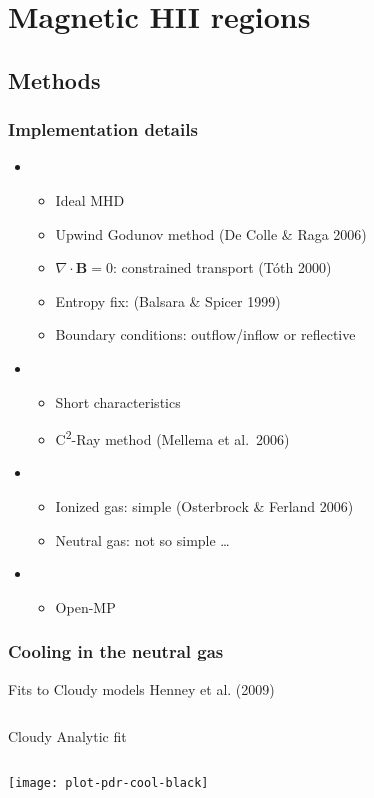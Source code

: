 \documentclass{beamer}
\newcommand\Ref[1]{\textcolor{white!70!black!90!yellow}{#1}}
\begin{document}
\section{Magnetic HII regions}

\subsection{Methods}

\begin{frame}
  \frametitle{Implementation details}
  \begin{itemize}
  \item {}
    \begin{itemize}
    \item Ideal MHD
    \item Upwind Godunov method \Ref{(De Colle \& Raga 2006)}
    \item \(\nabla \cdot \mathbf{B} = 0\): constrained transport \Ref{(Tóth 2000)}
    \item Entropy fix: \Ref{(Balsara \& Spicer 1999)}
    \item Boundary conditions: outflow/inflow or reflective
    \end{itemize}
  \item {}
    \begin{itemize}
    \item Short characteristics
    \item C\textsuperscript{2}-Ray method \Ref{(Mellema et al.\ 2006)}
    \end{itemize}
  \item {}
    \begin{itemize}
    \item Ionized gas: simple \Ref{(Osterbrock \& Ferland 2006)}
    \item Neutral gas: not so simple \dots
    \end{itemize}
  \item {}
    \begin{itemize}
    \item Open-MP
    \end{itemize}
  \end{itemize}
\end{frame}


\begin{frame}
  \frametitle{Cooling in the neutral gas}
  \begin{block}{Fits to Cloudy models}
    \centering
    \Ref{Henney et al. (2009)}\\ \medskip
    \begin{columns}
      \centering
      Cloudy
      \centering
      Analytic fit
    \end{columns}\medskip
    \texttt{[image: plot-pdr-cool-black]}
  \end{block}
\end{frame}
\end{document}
